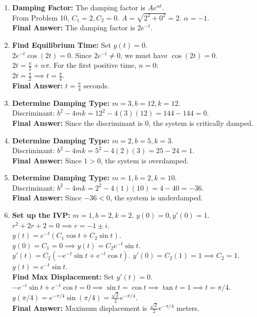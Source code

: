 \documentclass[11pt]{article}
\begin{document}
\begin{enumerate}[label=\textbf{\arabic*.}]
    \item \textbf{Damping Factor:} The damping factor is $Ae^{\alpha t}$. \\
    From Problem 10, $C_1 = 2, C_2 = 0$. $A = \sqrt{2^2 + 0^2} = 2$. $\alpha = -1$. \\
    \textbf{Final Answer:} The damping factor is $2e^{-t}$.

    \item \textbf{Find Equilibrium Time:} Set $y(t) = 0$. \\
    $2e^{-t}\cos(2t) = 0$. Since $2e^{-t} \neq 0$, we must have $\cos(2t) = 0$. \\
    $2t = \frac{\pi}{2} + n\pi$. For the first positive time, $n=0$: \\
    $2t = \frac{\pi}{2} \implies t = \frac{\pi}{4}$. \\
    \textbf{Final Answer:} $t = \frac{\pi}{4}$ seconds.

    \item \textbf{Determine Damping Type:} $m=3, b=12, k=12$. \\
    Discriminant: $b^2 - 4mk = 12^2 - 4(3)(12) = 144 - 144 = 0$. \\
    \textbf{Final Answer:} Since the discriminant is 0, the system is critically damped.

    \item \textbf{Determine Damping Type:} $m=2, b=5, k=3$. \\
    Discriminant: $b^2 - 4mk = 5^2 - 4(2)(3) = 25 - 24 = 1$. \\
    \textbf{Final Answer:} Since $1 > 0$, the system is overdamped.

    \item \textbf{Determine Damping Type:} $m=1, b=2, k=10$. \\
    Discriminant: $b^2 - 4mk = 2^2 - 4(1)(10) = 4 - 40 = -36$. \\
    \textbf{Final Answer:} Since $-36 < 0$, the system is underdamped.

    \item \textbf{Set up the IVP:} $m=1, b=2, k=2$. $y(0) = 0, y'(0) = 1$. \\
    $r^2 + 2r + 2 = 0 \implies r = -1 \pm i$. \\
    $y(t) = e^{-t}(C_1 \cos t + C_2 \sin t)$. \\
    $y(0) = C_1 = 0 \implies y(t) = C_2 e^{-t}\sin t$. \\
    $y'(t) = C_2(-e^{-t}\sin t + e^{-t}\cos t)$. $y'(0) = C_2(1) = 1 \implies C_2 = 1$. \\
    $y(t) = e^{-t}\sin t$. \\
    \textbf{Find Max Displacement:} Set $y'(t) = 0$. \\
    $-e^{-t}\sin t + e^{-t}\cos t = 0 \implies \sin t = \cos t \implies \tan t = 1 \implies t = \pi/4$. \\
    $y(\pi/4) = e^{-\pi/4}\sin(\pi/4) = \frac{\sqrt{2}}{2}e^{-\pi/4}$. \\
    \textbf{Final Answer:} Maximum displacement is $\frac{\sqrt{2}}{2}e^{-\pi/4}$ meters.


\end{enumerate}
\end{document}
